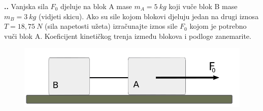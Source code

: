 


\noindent 
\textbf{
\thecjelina.\thezadatak.}
Vanjska sila $F_0$ djeluje na blok A mase $m_A= 5\ kg$ koji vuče blok B mase $m_B= 3\ kg$ (vidjeti skicu). Ako su sile kojom blokovi djeluju jedan na drugi iznosa $T=18,75\ N$ (sila napetosti užeta) izračunajte iznos sile $F_0$ kojom je potrebno vuči blok A. Koeficijent kinetičkog trenja između blokova i podloge zanemarite.


\begin{figure}[h]%
  \begin{center}
    \includegraphics[scale=0.30]{03_Dinamika_materijalne_tocke/blok_Zadatak_4_2.png}
  \end{center}
\end{figure}


